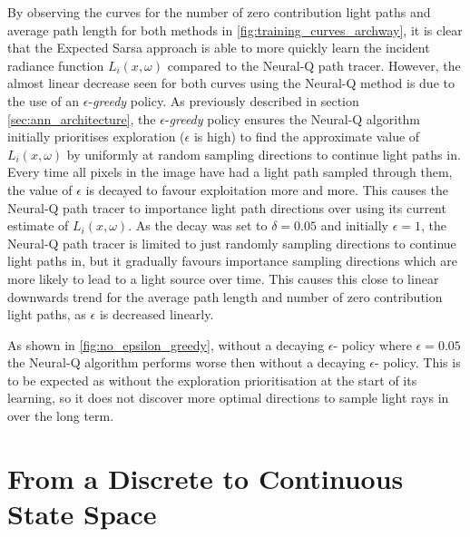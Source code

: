 \documentclass[../dissertation.tex]{subfiles}
\begin{document}
By observing the curves for the number of zero contribution light paths and average path length for both methods in \ref{fig:training_curves_archway}, it is clear that the Expected Sarsa approach is able to more quickly learn the incident radiance function $L_i(x, \omega)$ compared to the Neural-Q path tracer. However, the almost linear decrease seen for both curves using the Neural-Q method is due to the use of an $\epsilon$-\textit{greedy} policy. As previously described in section \ref{sec:ann_architecture}, the $\epsilon$-\textit{greedy} policy ensures the Neural-Q algorithm initially prioritises exploration ($\epsilon$ is high) to find the approximate value of $L_i(x,\omega)$ by uniformly at random sampling directions to continue light paths in. Every time all pixels in the image have had a light path sampled through them, the value of $\epsilon$ is decayed to favour exploitation more and more. This causes the Neural-Q path tracer to importance light path directions over using its current estimate of $L_i(x, \omega)$. As the decay was set to $\delta = 0.05$ and initially $\epsilon = 1$, the Neural-Q path tracer is limited to just randomly sampling directions to continue light paths in, but it gradually favours importance sampling directions which are more likely to lead to a light source over time. This causes this close to linear downwards trend for the average path length and number of zero contribution light paths, as $\epsilon$ is decreased linearly. 



As shown in \ref{fig:no_epsilon_greedy}, without a decaying $\epsilon$- policy where $\epsilon = 0.05$ the Neural-Q algorithm performs worse then without a decaying $\epsilon$- policy. This is to be expected as without the exploration prioritisation at the start of its learning, so it does not discover more optimal directions to sample light rays in over the long term.

\section{From a Discrete to Continuous State Space}
\end{document}
